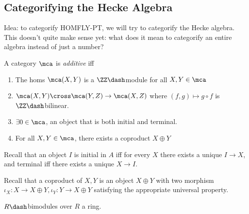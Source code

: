 \begin{remark}
\end{remark}

\hypertarget{categorifying-the-hecke-algebra}{%
\subsection{Categorifying the Hecke
Algebra}\label{categorifying-the-hecke-algebra}}

Idea: to categorify HOMFLY-PT, we will try to categorify the Hecke
algebra. This doesn't quite make sense yet: what does it mean to
categorify an entire algebra instead of just a number?

\begin{definition}

A category \(\mca\) is \emph{additive} iff

\begin{enumerate}
\def\labelenumi{\arabic{enumi}.}
\tightlist
\item
  The homs \(\mca(X, Y)\) is a \(\ZZ\dash\)module for all
  \(X, Y\in \mca\)
\item
  \(\mca(X, Y) \cross \mca(Y, Z) \to \mca(X, Z)\) where
  \((f, g) \mapsto g\circ f\) is \(\ZZ\dash\)bilinear.
\item
  \(\exists 0\in \mca\), an object that is both initial and terminal.
\item
  For all \(X, Y\in \mca\), there exists a coproduct \(X\oplus Y\)
\end{enumerate}

\end{definition}

\begin{definition}

Recall that an object \(I\) is initial in \(A\) iff for every \(X\)
there exists a unique \(I\to X\), and terminal iff there exists a unique
\(X\to I\).

\end{definition}

\begin{definition}[Coproduct]

Recall that a coproduct of \(X, Y\) is an object \(X\oplus Y\) with two
morphism \(\iota_X: X\to X\oplus Y, \iota_Y: Y\to X\oplus Y\) satisfying
the appropriate universal property.

\end{definition}

\begin{example}

\(R\dash\)bimodules over \(R\) a ring.

\end{example}

